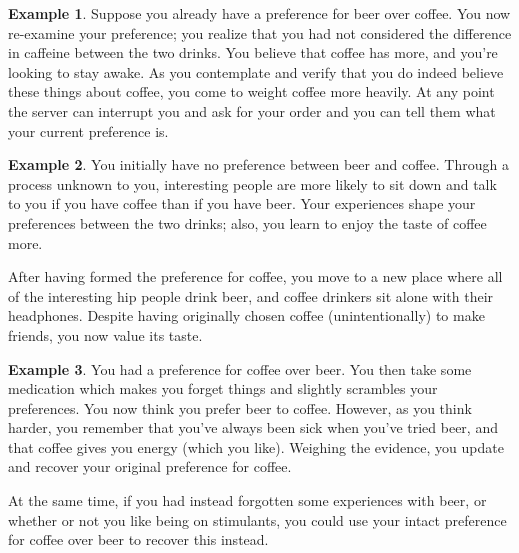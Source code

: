 \documentclass{article}
\theoremstyle{plain}
\theoremstyle{definition}
\newtheorem{example}{Example}[section]
\theoremstyle{remark}
\begin{document}
	\begin{example} \label{ex:caffeiene}
		Suppose you already have a preference for beer over coffee. You now re-examine your preference; you realize that you had not considered the difference in caffeine between the two drinks. You believe that coffee has more, and you're looking to stay awake. As you contemplate and verify that you do indeed believe these things about coffee, you come to weight coffee more heavily. At any point the server can interrupt you and ask for your order and you can tell them what your current preference is.
	\end{example}

	\begin{example}
		You initially have no preference between beer and coffee. Through a process unknown to you, interesting people are more likely to sit down and talk to you if you have coffee than if you have beer. Your experiences shape your preferences between the two drinks; also, you learn to enjoy the taste of coffee more.
		
		After having formed the preference for coffee, you move to a new place where all of the interesting hip people drink beer, and coffee drinkers sit alone with their headphones. Despite having originally chosen coffee (unintentionally) to make friends, you now value its taste. 
	\end{example}

	\begin{example}
		You had a preference for coffee over beer. You then take some medication which makes you forget things and slightly scrambles your preferences. You now think you prefer beer to coffee. However, as you think harder, you remember that you've always been sick when you've tried beer, and that coffee gives you energy (which you like). Weighing the evidence, you  update and recover your original preference for coffee.
		
		At the same time, if you had instead forgotten some experiences with beer, or whether or not you like being on stimulants, you could use your intact preference for coffee over beer to recover this instead.
	\end{example}
\end{document}
